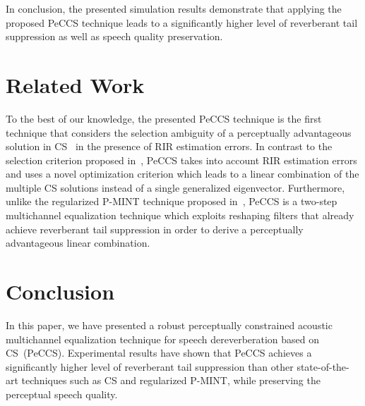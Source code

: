 \documentclass{article}
\begin{document}
In conclusion, the presented simulation results demonstrate that applying the proposed PeCCS technique leads to a significantly higher level of reverberant tail suppression as well as speech quality preservation.

\section{Related Work}
To the best of our knowledge, the presented PeCCS technique is the first technique that considers the selection ambiguity of a perceptually advantageous solution in CS~\cite{Zhang_IWAENC_2010,Kallinger_ICASSP_2006} in the presence of RIR estimation errors.
In contrast to the selection criterion proposed in~\cite{Zhang_IWAENC_2010}, PeCCS takes into account RIR estimation errors and uses a novel optimization criterion which leads to a linear combination of the multiple CS solutions instead of a single generalized eigenvector.
Furthermore, unlike the regularized P-MINT technique proposed in~\cite{Kodrasi_IWAENC_2012}, PeCCS is a two-step multichannel equalization technique which exploits reshaping filters that already achieve reverberant tail suppression in order to derive a perceptually advantageous linear combination.

\section{Conclusion}
In this paper, we have presented a robust perceptually constrained acoustic multichannel equalization technique for speech dereverberation based on CS~(PeCCS).
Experimental results have shown that PeCCS achieves a significantly higher level of reverberant tail suppression than other state-of-the-art techniques such as CS and regularized P-MINT, while preserving the perceptual speech quality.

\pagebreak


\end{document}
